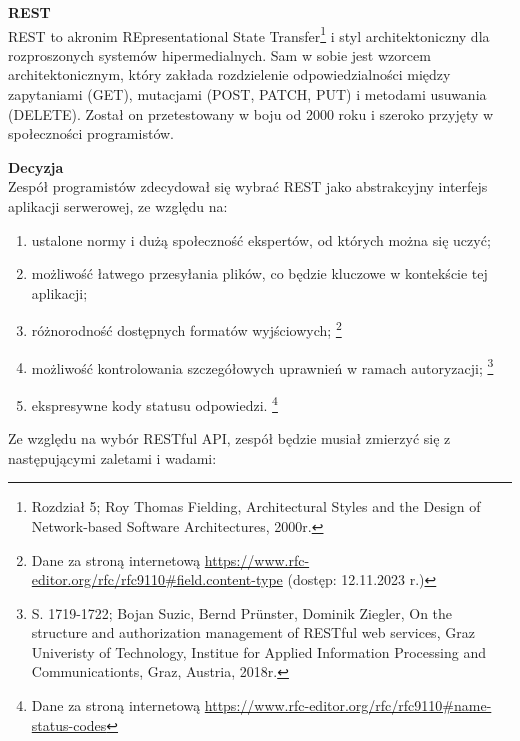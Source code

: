 \documentclass[12pt, a4paper, twoside, openany]{book}
\begin{document}
\textbf{REST}\\
REST to akronim REpresentational State Transfer\footnote{Rozdział 5; Roy Thomas Fielding, Architectural Styles and the Design of Network-based Software Architectures, 2000r.} i styl architektoniczny dla rozproszonych systemów hipermedialnych. Sam w sobie jest wzorcem architektonicznym, który zakłada rozdzielenie odpowiedzialności między zapytaniami (GET), mutacjami (POST, PATCH, PUT) i metodami usuwania (DELETE). Został on przetestowany w boju od 2000 roku i szeroko przyjęty w społeczności programistów.

\textbf{Decyzja}\\
Zespół programistów zdecydował się wybrać REST jako abstrakcyjny interfejs aplikacji serwerowej, ze względu na:
\begin{enumerate}[label=--]
    \item ustalone normy i dużą społeczność ekspertów, od których można się uczyć;
    \item możliwość łatwego przesyłania plików, co będzie kluczowe w kontekście tej aplikacji;
    \item różnorodność dostępnych formatów wyjściowych; \footnote{Dane za stroną internetową \url{https://www.rfc-editor.org/rfc/rfc9110#field.content-type} (dostęp: 12.11.2023 r.)}
    \item możliwość kontrolowania szczegółowych uprawnień w ramach autoryzacji; \footnote{S. 1719-1722; Bojan Suzic, Bernd Prünster, Dominik Ziegler, On the structure and authorization management of RESTful web services, Graz Univeristy of Technology, Institue for Applied Information Processing and Communicationts, Graz, Austria, 2018r.}
    \item ekspresywne kody statusu odpowiedzi. \footnote{Dane za stroną internetową \url{https://www.rfc-editor.org/rfc/rfc9110#name-status-codes}}
\end{enumerate}

Ze względu na wybór RESTful API, zespół będzie musiał zmierzyć się z następującymi zaletami i wadami:
\end{document}
